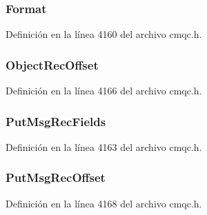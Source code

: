 \subsubsection[{Format}]{ Format}\label{structtag_m_q_d_h_a435a478822008713f8aaff89f369ed63}


Definición en la línea 4160 del archivo cmqc.\+h.

\hypertarget{structtag_m_q_d_h_a8ec0fdf14ab5b4d0f7caf7f333dfbeb4}{}
\subsubsection[{Object\+Rec\+Offset}]{ Object\+Rec\+Offset}\label{structtag_m_q_d_h_a8ec0fdf14ab5b4d0f7caf7f333dfbeb4}


Definición en la línea 4166 del archivo cmqc.\+h.

\hypertarget{structtag_m_q_d_h_aea1b77e1a6f2b6f18526055315f8b175}{}
\subsubsection[{Put\+Msg\+Rec\+Fields}]{ Put\+Msg\+Rec\+Fields}\label{structtag_m_q_d_h_aea1b77e1a6f2b6f18526055315f8b175}


Definición en la línea 4163 del archivo cmqc.\+h.

\hypertarget{structtag_m_q_d_h_a49f55d9686cdc9c051e09950fede2098}{}
\subsubsection[{Put\+Msg\+Rec\+Offset}]{ Put\+Msg\+Rec\+Offset}\label{structtag_m_q_d_h_a49f55d9686cdc9c051e09950fede2098}


Definición en la línea 4168 del archivo cmqc.\+h.

\hypertarget{structtag_m_q_d_h_a7592da03e0f1c9bc79c9dd4e641dcf73}{}
